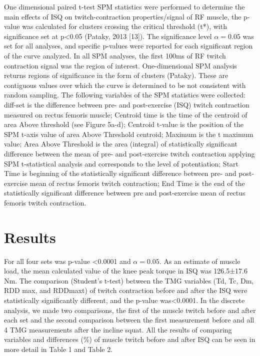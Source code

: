 \documentclass[utf8]{style/FrontiersinHarvard}
\begin{document}
One dimensional paired t-test SPM statistics were performed to determine the main effects of ISQ on twitch-contraction properties/signal of RF muscle, the p-value was calculated for clusters crossing the critical threshold (t*), with significance set at p<0.05 (Pataky, 2013 [13]).
The significance level $ \alpha = 0.05 $ was set for all analyses, and specific p-values were reported for each significant region of the curve analyzed. In all SPM analyses, the first 100ms of RF twitch contraction signal was the region of interest.
One-dimensional SPM analysis returns regions of significance in the form of clusters (Pataky).
These are contiguous values over which the curve is determined to be not consistent with random sampling.
The following variables of the SPM statistics were collected: diff-set is the difference between pre- and post-exercise (ISQ) twitch contraction measured on rectus femoris muscle;
Centroid time is the time of the centroid of area Above threshold (see Figure 5a-d);
Centroid t-value is the position of the SPM t-axis value of area Above Threshold centroid;
Maximum is the t maximum value;
Area Above Threshold is the area (integral) of statistically significant difference between the mean of pre- and post-exercise twitch contraction applying SPM t-statistical analysis and corresponds to the level of potentiation;
Start Time is beginning of the statistically significant difference between pre- and post-exercise mean of rectus femoris twitch contraction;
End Time is the end of the statistically significant difference between pre and post-exercise mean of rectus femoris twitch contraction.

\section{Results}
For all four sets was p-value <0.0001 and $ \alpha = 0.05 $.
As an estimate of muscle load, the mean calculated value of the knee peak torque in ISQ was 126.5±17.6 Nm.
The comparison (Student's t-test) between the TMG variables (Td, Tc, Dm, RDD max, and RDDmaxt) of twitch contraction before and after the ISQ were statistically significantly different, and the p-value was<0.0001.
In the discrete analysis, we made two comparisons, the first of the muscle twitch before and after each set and the second comparison between the first measurement before and all 4 TMG measurements after the incline squat.
All the results of comparing variables and differences (\%) of muscle twitch before and after ISQ can be seen in more detail in Table 1 and Table 2.
\end{document}
